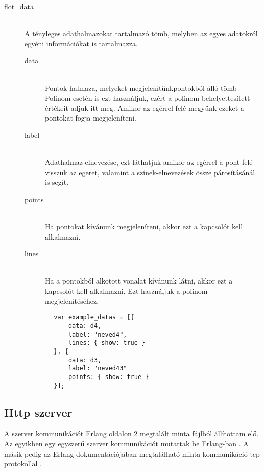 \begin{description}
 		\item[flot\_data] \hfill \\ 
 		A tényleges adathalmazokat tartalmazó tömb, melyben az egyes adatokról egyéni információkat is tartalmazza.\newline
 		\begin{description}
			\item[data] \hfill \\ 
			Pontok halmaza, melyeket megjelenítünk\newline
			[x, y] pontokból álló tömb\newline
			Polinom esetén is ezt használjuk, ezért a polinom behelyettesített értékeit adjuk itt meg. Amikor az egérrel felé megyünk ezeket a pontokat fogja megjeleníteni.
			\item[label] \hfill \\ 
			Adathalmaz elnevezése, ezt láthatjuk amikor az egérrel a pont felé visszük az egeret, valamint a színek-elnevezések össze párosításánál is segít.
			\item[points] \hfill \\ 
			Ha pontokat kívánunk megjeleníteni, akkor ezt a kapcsolót kell alkalmazni.
			\item[lines] \hfill \\ 
			Ha a pontokból alkotott vonalat kívánunk látni, akkor ezt a kapcsolót kell alkalmazni. Ezt használjuk a polinom megjelenítéséhez.
		\end{description}
 		\begin{verbatim}
		var example_datas = [{
		    data: d4,
		    label: "neved4",
		    lines: { show: true }
		}, {
		    data: d3,
		    label: "neved43"
		    points: { show: true }
		}];
		\end{verbatim}
	\end{description}

\subsection{Http szerver \label{subsec:httpszerver}}
	A szerver kommunikációt Erlang oldalon 2 megtalált minta fájlból állítottam elő. Az egyikben egy egyszerű szerver kommunikációt mutattak be Erlang-ban \cite{simpleserver}. \newline
	A másik pedig az Erlang dokumentációjában megtalálható minta kommunikáció tcp protokollal \cite{tcpserver}.

